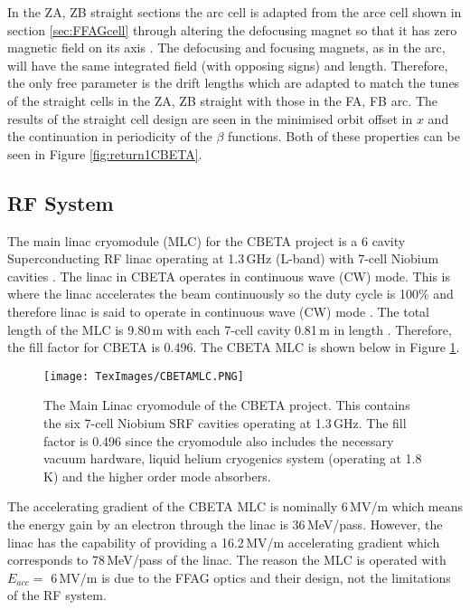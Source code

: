 \documentclass[11pt]{article}
\begin{document}
In the ZA, ZB straight sections the arc cell is adapted from the arce cell shown in section \ref{sec:FFAGcell} through altering the defocusing magnet so that it has zero magnetic field on its axis \cite{CBETATDR}. The defocusing and focusing magnets, as in the arc, will have the same integrated field (with opposing signs) and length. Therefore, the only free parameter is the drift lengths which are adapted to match the tunes of the straight cells in the ZA, ZB straight with those in the FA, FB arc. The results of the straight cell design are seen in the minimised orbit offset in $x$ and the continuation in periodicity of the $\beta$ functions. Both of these properties can be seen in Figure \ref{fig:return1CBETA}.   

\subsection{RF System}

The main linac cryomodule (MLC) for the CBETA project is a 6 cavity Superconducting RF linac operating at 1.3\,GHz (L-band) with 7-cell Niobium cavities \cite{CBETATDR}. The linac in CBETA operates in continuous wave (CW) mode. This is where the linac accelerates the beam continuously so the duty cycle is 100\% and therefore linac is said to operate in continuous wave (CW) mode \cite{DutyCycle}. The total length of the MLC is 9.80\,m with each 7-cell cavity 0.81\,m in length \cite{CBETATDR}. Therefore, the fill factor for CBETA is 0.496. The CBETA MLC is shown below in Figure \ref{fig:CBETAMLC}.

\begin{figure}[H]
\centering
\texttt{[image: TexImages/CBETAMLC.PNG]}
\caption{\label{fig:CBETAMLC} The Main Linac cryomodule of the CBETA project. This contains the six 7-cell Niobium SRF cavities operating at 1.3\,GHz. The fill factor is 0.496 since the cryomodule also includes the necessary vacuum hardware, liquid helium cryogenics system (operating at 1.8\,K) and the higher order mode absorbers.}
\end{figure}

The accelerating gradient of the CBETA MLC is nominally 6\,MV/m which means the energy gain by an electron through the linac is 36\,MeV/pass. However, the linac has the capability of providing a 16.2\,MV/m accelerating gradient which corresponds to 78\,MeV/pass of the linac. The reason the MLC is operated with $E_{acc} =$ 6\,MV/m is due to the FFAG optics and their design, not the limitations of the RF system.
\end{document}
